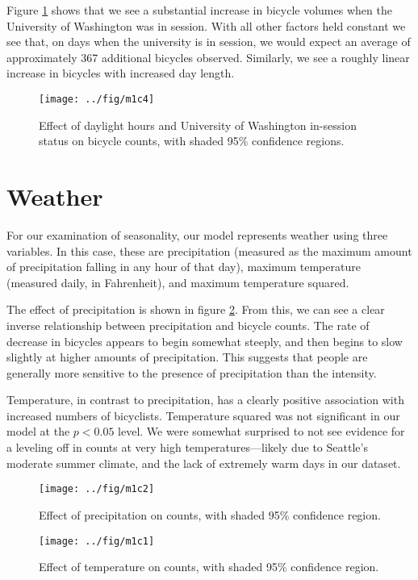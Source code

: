 \documentclass[12pt,letterpaper,article]{memoir}
\begin{document}
Figure \ref{fg:seasonality} shows that we see a substantial increase
in bicycle volumes when the University of Washington was in session.
With all other factors held constant we see that, on days when the
university is in session, we would expect an average of approximately
367 additional bicycles observed. Similarly, we see a roughly linear
increase in bicycles with increased day length.

\begin{figure}[htbp!]
  \centering
  \texttt{[image: ../fig/m1c4]}
  \caption{Effect of daylight hours and University of Washington
    in-session status on bicycle counts, with shaded 95\% confidence
    regions.}
  \label{fg:seasonality}
\end{figure}

\FloatBarrier
\section*{Weather}
For our examination of seasonality, our model represents weather using
three variables. In this case, these are precipitation (measured as
the maximum amount of precipitation falling in any hour of that day),
maximum temperature (measured daily, in Fahrenheit), and maximum
temperature squared.

The effect of precipitation is shown in figure \ref{fg:precipitation}.
From this, we can see a clear inverse relationship between
precipitation and bicycle counts. The rate of decrease in bicycles
appears to begin somewhat steeply, and then begins to slow slightly at
higher amounts of precipitation. This suggests that people are
generally more sensitive to the presence of precipitation than the
intensity.

Temperature, in contrast to precipitation, has a clearly positive
association with increased numbers of bicyclists. Temperature squared
was not significant in our model at the $p < 0.05$ level. We were
somewhat surprised to not see evidence for a leveling off in counts at
very high temperatures---likely due to Seattle's moderate summer
climate, and the lack of extremely warm days in our dataset.

\begin{figure}[ht!]
  \centering
  \texttt{[image: ../fig/m1c2]}
  \caption{Effect of precipitation on counts, with shaded 95\%
    confidence region.}
  \label{fg:precipitation}
\end{figure}

\begin{figure}[ht!]
  \centering
  \texttt{[image: ../fig/m1c1]}
  \caption{Effect of temperature on counts, with shaded 95\%
    confidence region.}
  \label{fg:temperature}
\end{figure}
\end{document}
